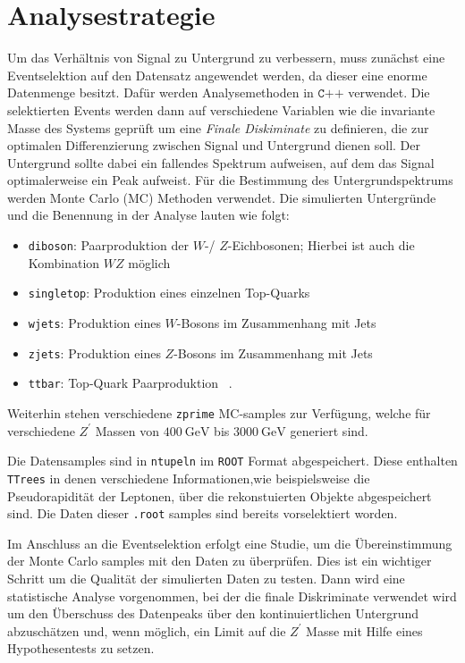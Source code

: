 \section{Analysestrategie}
Um das Verhältnis von Signal zu Untergrund zu verbessern, muss zunächst eine Eventselektion auf den Datensatz angewendet werden, da dieser eine enorme
Datenmenge besitzt. Dafür werden Analysemethoden in $\texttt{C++}$ verwendet. Die selektierten Events werden dann auf verschiedene Variablen wie die
invariante Masse des Systems geprüft um eine \textit{Finale Diskiminate} zu definieren, die zur optimalen Differenzierung zwischen Signal und
Untergrund dienen soll. Der Untergrund sollte dabei ein fallendes Spektrum aufweisen, auf dem das Signal optimalerweise ein Peak aufweist. Für die
Bestimmung des Untergrundspektrums werden Monte Carlo (MC) Methoden verwendet. Die simulierten Untergründe und die Benennung in der Analyse lauten
wie folgt:

\begin{itemize}
    \item \texttt{diboson}: Paarproduktion der $W$-/ $Z$-Eichbosonen; Hierbei ist auch die Kombination $WZ$ möglich
    \item \texttt{singletop}: Produktion eines einzelnen Top-Quarks
    \item \texttt{wjets}: Produktion eines $W$-Bosons im Zusammenhang mit Jets
    \item \texttt{zjets}: Produktion eines $Z$-Bosons im Zusammenhang mit Jets
    \item \texttt{ttbar}: Top-Quark Paarproduktion \, .
\end{itemize}

Weiterhin stehen verschiedene \texttt{zprime} MC-samples zur Verfügung, welche für verschiedene $Z^\prime$ Massen von $\SI{400}{\giga\electronvolt}$ bis
$\SI{3000}{\giga\electronvolt}$ generiert sind. \par
Die Datensamples sind in \texttt{ntupeln} im \texttt{ROOT} Format abgespeichert. Diese enthalten \texttt{TTrees} in denen verschiedene Informationen,wie beispielsweise
die Pseudorapidität der Leptonen, über
die rekonstuierten Objekte abgespeichert sind. Die Daten dieser \texttt{.root} samples sind bereits vorselektiert worden. \par

Im Anschluss an die Eventselektion erfolgt eine Studie, um die Übereinstimmung der Monte Carlo samples mit den Daten zu überprüfen. Dies ist ein wichtiger
Schritt um die Qualität der simulierten Daten zu testen. Dann wird eine statistische Analyse vorgenommen, bei der die finale Diskriminate verwendet wird
um den Überschuss des Datenpeaks über den kontinuiertlichen Untergrund abzuschätzen und, wenn möglich, ein Limit auf die $Z^\prime$ Masse mit Hilfe eines
Hypothesentests zu setzen.
